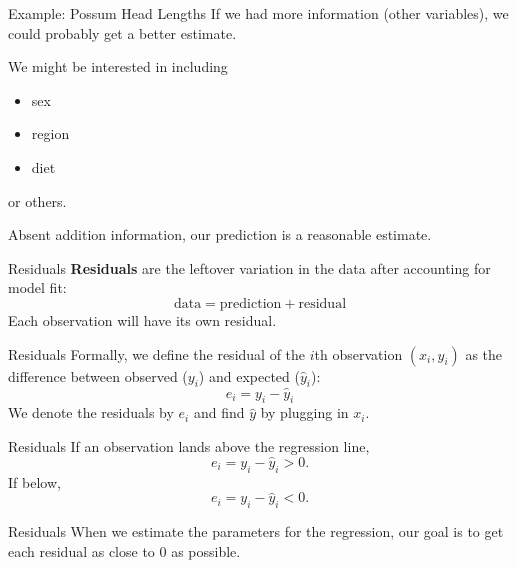\begin{frame}{Example: Possum Head Lengths}
    If we had more information (other variables), we could probably get a better estimate. 
    
    \vspace{12pt}We might be interested in including
    \begin{itemize}
        \item sex
        \item region
        \item diet
    \end{itemize}
    or others.
    
    \vspace{12pt}Absent addition information, our prediction is a reasonable estimate.
\end{frame}

\begin{frame}{Residuals}
    \textbf{Residuals} are the leftover variation in the data after accounting for model fit:
    \[
        \text{data} = \text{prediction} + \text{residual}
    \]
    Each observation will have its own residual.
\end{frame}

\begin{frame}{Residuals}
    Formally, we define the residual of the $i$th observation $(x_i,y_i)$ as the difference between observed ($y_i$) and expected ($\hat{y}_i$):
    \[
        e_i = y_i - \hat{y}_i
    \] 
    We denote the residuals by $e_i$ and find $\hat{y}$ by plugging in $x_i$.
\end{frame}

\begin{frame}{Residuals}
    If an observation lands above the regression line,
    \[
        e_i = y_i - \hat{y}_i > 0.
    \]
    If below,
    \[
        e_i = y_i - \hat{y}_i < 0.
    \]
\end{frame}

\begin{frame}{Residuals}
    When we estimate the parameters for the regression, our goal is to get each residual as close to 0 as possible.
\end{frame}


